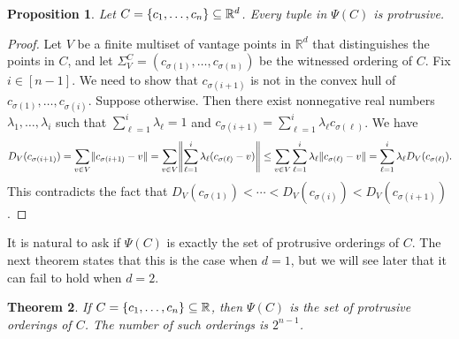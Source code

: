 \documentclass[11pt]{amsart}
\newtheorem{theorem}{Theorem}[section]
\newtheorem{proposition}[theorem]{Proposition}
\theoremstyle{definition}
\DeclarePairedDelimiter{\set}{\{}{\}}
\DeclarePairedDelimiter{\Abs}{\lVert}{\rVert}
\newcommand{\RR}{\mathbb{R}}
\begin{document}
\begin{proposition}\label{prop:convexity}
Let $C=\set{c_1,\ldots,c_n}\subseteq\RR^d$. Every tuple in $\Psi(C)$ is protrusive.  
\end{proposition}

\begin{proof}
Let $V$ be a finite multiset of vantage points in $\RR^d$ that distinguishes the points in $C$, and let $\Sigma_V^C=(c_{\sigma(1)},\ldots,c_{\sigma(n)})$ be the witnessed ordering of $C$. Fix $i\in[n-1]$. We need to show that $c_{\sigma(i+1)}$ is not in the convex hull of $c_{\sigma(1)},\ldots,c_{\sigma(i)}$. Suppose otherwise. Then there exist nonnegative real numbers $\lambda_1,\ldots,\lambda_i$ such that $\sum_{\ell=1}^i\lambda_\ell=1$ and $c_{\sigma(i+1)}=\sum_{\ell=1}^i\lambda_\ell c_{\sigma(\ell)}$. We have \[D_V(c_{\sigma(i+1)})=\sum_{v\in V}\Abs{c_{\sigma(i+1)}-v}=\sum_{v\in V}\Abs*{\sum_{\ell=1}^i\lambda_\ell(c_{\sigma(\ell)}-v)}\leq\sum_{v\in V}\sum_{\ell=1}^i\lambda_\ell\Abs{c_{\sigma(\ell)}-v}=\sum_{\ell=1}^i\lambda_\ell D_V(c_{\sigma(\ell)}).\] This contradicts the fact that $D_V(c_{\sigma(1)})<\cdots<D_V(c_{\sigma(i)})<D_V(c_{\sigma(i+1)})$. 
\end{proof}

It is natural to ask if $\Psi(C)$ is exactly the set of protrusive orderings of $C$. The next theorem states that this is the case when $d=1$, but we will see later that it can fail to hold when $d=2$. 

\begin{theorem}\label{thm:protrusive_d_1}
If $C=\set{c_1,\ldots,c_n}\subseteq \RR$, then $\Psi(C)$ is the set of protrusive orderings of $C$. The number of such orderings is $2^{n-1}$. 
\end{theorem}
\end{document}
